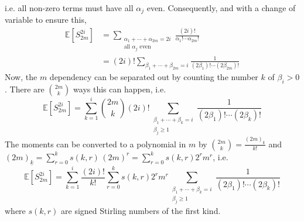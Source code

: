 \documentclass[a4paper]{amsart}
\begin{document}
i.e. all non-zero terms must have all $\alpha_j$ even. Consequently, and with a change of variable to ensure this,
\begin{align*}
\mathbb{E}[S_{2m}^{2i}]&=\sum_{\substack{\alpha_1+\cdots+\alpha_{2m}=2i\\ \text{all }\alpha_j\text{ even}}}
\frac{(2i)!}{\alpha_1!\cdots \alpha_{2m}!}\\
&=(2i)!\!\!\sum_{\beta_1+\cdots+\beta_{2m}=i}
\frac{1}{(2\beta_1)!\cdots(2\beta_{2m})!}
\end{align*}
Now, the $m$ dependency can be separated out by counting the number $k$ of $\beta_i>0$. There are $\binom{2m}{k}$ ways this can happen, i.e.
\begin{equation*}
\mathbb{E}[S_{2m}^{2i}]
=\sum_{k=1}^{i}\binom{2m}{k}(2i)!
\sum_{\substack{\beta_1+\cdots+\beta_k=i\\ \beta_j\ge 1}}
\frac{1}{(2\beta_1)!\cdots(2\beta_k)!}
\end{equation*}
The moments can be converted to a polynomial in $m$ by $\binom{2m}{k}=\frac{(2m)_{\underline{k}}}{k!}$ and $
(2m)_{\underline{k}}=\sum_{r=0}^{k} s(k,r)\,(2m)^r
=\sum_{r=0}^{k} s(k,r)2^r m^r$, i.e.
\begin{equation*}
\mathbb{E}[S_{2m}^{2i}]
=\sum_{k=1}^{i}\frac{(2i)!}{k!}\sum_{r=0}^{k} s(k,r)2^r m^r
\sum_{\substack{\beta_1+\cdots+\beta_k=i\\ \beta_j\ge 1}}
\frac{1}{(2\beta_1)!\cdots(2\beta_k)!}
\end{equation*}
where $s(k,r)$ are signed Stirling numbers of the first kind.
\end{document}
